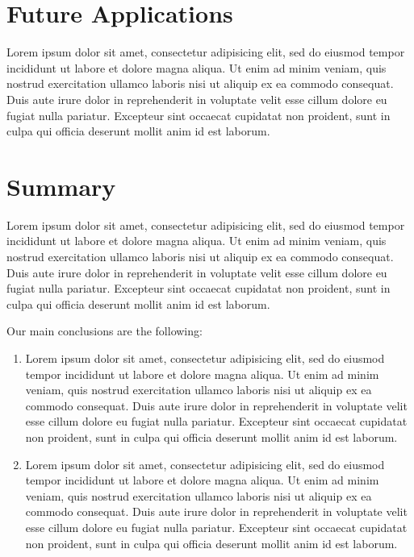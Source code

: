 \documentclass[fleqn,usenatbib]{mnras}
\begin{document}
\section{Future Applications}\label{sec:future}
Lorem ipsum dolor sit amet, consectetur adipisicing elit, sed do eiusmod tempor incididunt ut labore et dolore magna aliqua. Ut enim ad minim veniam, quis nostrud exercitation ullamco laboris nisi ut aliquip ex ea commodo consequat. Duis aute irure dolor in reprehenderit in voluptate velit esse cillum dolore eu fugiat nulla pariatur. Excepteur sint occaecat cupidatat non proident, sunt in culpa qui officia deserunt mollit anim id est laborum.

\section{Summary}\label{sec:summary}
Lorem ipsum dolor sit amet, consectetur adipisicing elit, sed do eiusmod tempor incididunt ut labore et dolore magna aliqua. Ut enim ad minim veniam, quis nostrud exercitation ullamco laboris nisi ut aliquip ex ea commodo consequat. Duis aute irure dolor in reprehenderit in voluptate velit esse cillum dolore eu fugiat nulla pariatur. Excepteur sint occaecat cupidatat non proident, sunt in culpa qui officia deserunt mollit anim id est laborum.

Our main conclusions are the following:
\begin{enumerate}
	\item Lorem ipsum dolor sit amet, consectetur adipisicing elit, sed do eiusmod tempor incididunt ut labore et dolore magna aliqua. Ut enim ad minim veniam, quis nostrud exercitation ullamco laboris nisi ut aliquip ex ea commodo consequat. Duis aute irure dolor in reprehenderit in voluptate velit esse cillum dolore eu fugiat nulla pariatur. Excepteur sint occaecat cupidatat non proident, sunt in culpa qui officia deserunt mollit anim id est laborum.

	\item Lorem ipsum dolor sit amet, consectetur adipisicing elit, sed do eiusmod tempor incididunt ut labore et dolore magna aliqua. Ut enim ad minim veniam, quis nostrud exercitation ullamco laboris nisi ut aliquip ex ea commodo consequat. Duis aute irure dolor in reprehenderit in voluptate velit esse cillum dolore eu fugiat nulla pariatur. Excepteur sint occaecat cupidatat non proident, sunt in culpa qui officia deserunt mollit anim id est laborum.
\end{enumerate}
\end{document}
